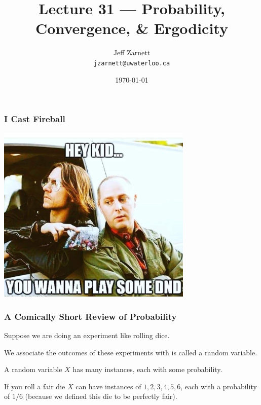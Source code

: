 

\title{Lecture 31 --- Probability, Convergence, \& Ergodicity}

\author{Jeff Zarnett\\ \small \texttt{jzarnett@uwaterloo.ca}}
\date{\today}




\begin{frame}
  \titlepage

 \end{frame}



\begin{frame}
\frametitle{I Cast Fireball}

\begin{center}
	\includegraphics[width=0.7\textwidth]{images/dnd.jpg}
\end{center}


\end{frame}



\begin{frame}
\frametitle{A Comically Short Review of Probability}

Suppose we are doing an experiment like rolling dice.

We associate the outcomes of these experiments with is called a random variable.

A random variable $X$ has many instances, each with some probability.

If you roll a fair die $X$ can have instances of ${1, 2, 3, 4, 5, 6}$, each with a probability of $1/6$ (because we defined this die to be perfectly fair).


\end{frame}



